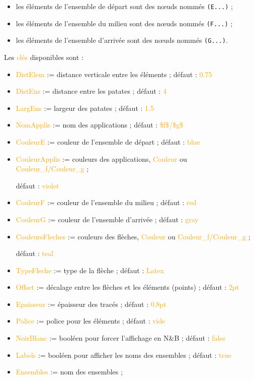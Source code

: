 \documentclass[french,a4paper,11pt]{article}
\newcommand\Cle[1]{{\small\sffamily\textlangle \textcolor{orange}{#1}\textrangle}}
\begin{document}
{{\begin{tipblock}
\begin{itemize}
	\item les éléments de l'ensemble de départ sont des nœuds nommés \verb!(E...)! ;
	\item les éléments de l'ensemble du milieu sont des nœuds nommés \verb!(F...)! ;
	\item les éléments de l'ensemble d'arrivée sont des nœuds nommés \verb!(G...)!.
\end{itemize}
\vspace*{-\baselineskip}\leavevmode
\end{tipblock}

\begin{tipblock}
Les \Cle{clés} disponibles sont :

\begin{itemize}
	\item \Cle{DistElem} := distance verticale entre les éléments ; \hfill{}défaut : \Cle{0.75}
	\item \Cle{DistEns} := distance entre les \og patates \fg{} ; \hfill{}défaut : \Cle{4}
	\item \Cle{LargEns} := largeur des \og patates \fg{} ; \hfill{}défaut : \Cle{1.5}
	\item \Cle{NomApplis} := nom des applications ; \hfill{}défaut : \Cle{\$f\$/\$g\$}
	\item \Cle{CouleurE} := couleur de l'ensemble de départ ; \hfill{}défaut : \Cle{blue}
	\item \Cle{CouleurApplis} := couleurs des applications, \Cle{Couleur} ou \Cle{Couleur\_f/Couleur\_g} ;
	
	\hfill{}défaut : \Cle{violet}
	\item \Cle{CouleurF} := couleur de l'ensemble du milieu ; \hfill{}défaut : \Cle{red}
	\item \Cle{CouleurG} := couleur de l'ensemble d'arrivée ; \hfill{}défaut : \Cle{gray}
	\item \Cle{CouleursFleches} := couleurs des flèches, \Cle{Couleur} ou \Cle{Couleur\_f/Couleur\_g} ; 
	
	\hfill{}défaut : \Cle{teal}
	\item \Cle{TypeFleche} := type de la flèche  ; \hfill{}défaut : \Cle{Latex}
	\item \Cle{Offset} := décalage entre les flèches et les éléments (points) ; \hfill{}défaut : \Cle{2pt}
	\item \Cle{Epaisseur} := épaisseur des tracés ; \hfill{}défaut : \Cle{0.8pt}
	\item \Cle{Police} := police pour les éléments ; \hfill{}défaut : \Cle{vide}
	\item \Cle{NoirBlanc} := booléen pour forcer l'affichage en N\&{}B ; \hfill{}défaut : \Cle{false}
	\item \Cle{Labels} := booléen pour afficher les noms des ensembles ; \hfill{}défaut : \Cle{true}
	\item \Cle{Ensembles} := nom des ensembles  ;
	

\end{itemize}
\end{tipblock}}}
\end{document}
